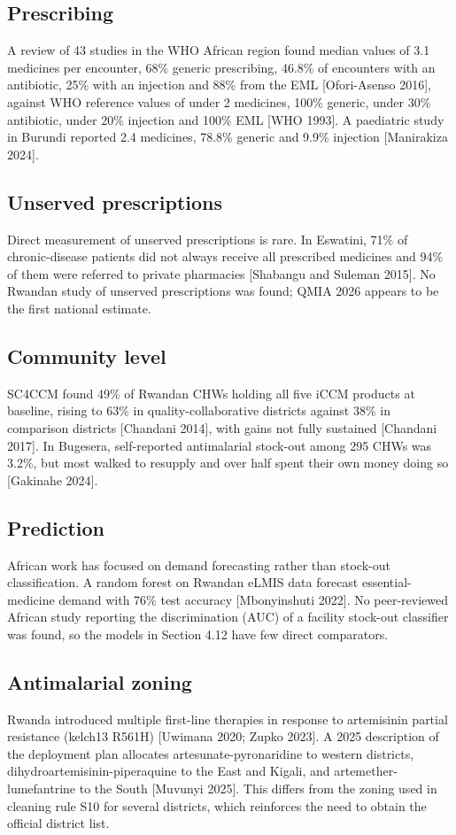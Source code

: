 \documentclass[10pt,a4paper]{report}
\begin{document}
\subsection{Prescribing}
A review of 43 studies in the WHO African region found median values of 3.1 medicines per encounter, 68\% generic prescribing, 46.8\% of encounters with an antibiotic, 25\% with an injection and 88\% from the EML [Ofori-Asenso 2016], against WHO reference values of under 2 medicines, 100\% generic, under 30\% antibiotic, under 20\% injection and 100\% EML [WHO 1993]. A paediatric study in Burundi reported 2.4 medicines, 78.8\% generic and 9.9\% injection [Manirakiza 2024].

\subsection{Unserved prescriptions}
Direct measurement of unserved prescriptions is rare. In Eswatini, 71\% of chronic-disease patients did not always receive all prescribed medicines and 94\% of them were referred to private pharmacies [Shabangu and Suleman 2015]. No Rwandan study of unserved prescriptions was found; QMIA 2026 appears to be the first national estimate.

\subsection{Community level}
SC4CCM found 49\% of Rwandan CHWs holding all five iCCM products at baseline, rising to 63\% in quality-collaborative districts against 38\% in comparison districts [Chandani 2014], with gains not fully sustained [Chandani 2017]. In Bugesera, self-reported antimalarial stock-out among 295 CHWs was 3.2\%, but most walked to resupply and over half spent their own money doing so [Gakinahe 2024].

\subsection{Prediction}
African work has focused on demand forecasting rather than stock-out classification. A random forest on Rwandan eLMIS data forecast essential-medicine demand with 76\% test accuracy [Mbonyinshuti 2022]. No peer-reviewed African study reporting the discrimination (AUC) of a facility stock-out classifier was found, so the models in Section 4.12 have few direct comparators.

\subsection{Antimalarial zoning}
Rwanda introduced multiple first-line therapies in response to artemisinin partial resistance (kelch13 R561H) [Uwimana 2020; Zupko 2023]. A 2025 description of the deployment plan allocates artesunate-pyronaridine to western districts, dihydroartemisinin-piperaquine to the East and Kigali, and artemether-lumefantrine to the South [Muvunyi 2025]. This differs from the zoning used in cleaning rule S10 for several districts, which reinforces the need to obtain the official district list.
\end{document}

